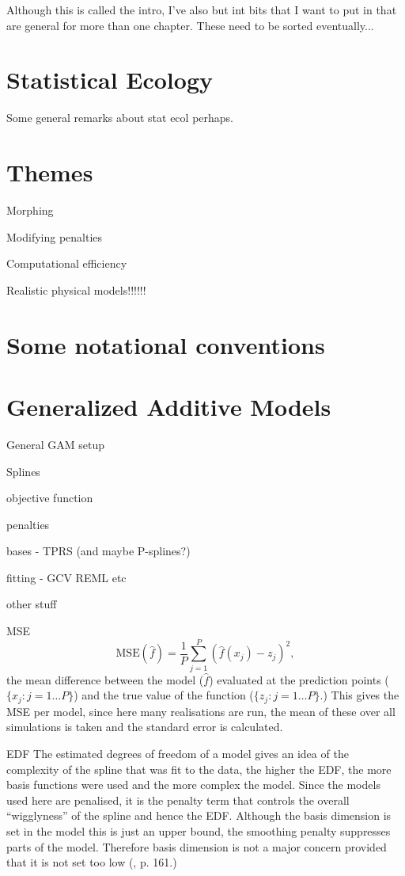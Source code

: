 Although this is called the intro, I've also but int bits that I want to put in that are general for more than one chapter. These need to be sorted eventually...

\section{Statistical Ecology}

Some general remarks about stat ecol perhaps.

\section{Themes}

\bi
	\item Morphing
	\item Modifying penalties
	\item Computational efficiency
	\item Realistic physical models!!!!!!
\ei


\section{Some notational conventions}



\section{Generalized Additive Models}

General GAM setup

\bi
\item Splines
\item objective function
\label{GAMobjfcn}
\item penalties
\label{GAMpenalties}
\item bases - TPRS (and maybe P-splines?)
\item fitting - GCV REML etc
\item other stuff
	\bi
	\item MSE
	\begin{equation}
\text{MSE}(\hat{f}) = \frac{1}{P} \sum_{j=1}^P (\hat{f}(x_j) - z_j)^2,
\end{equation}
the mean difference between the model ($\hat{f}$) evaluated at the prediction points ($\{x_j : j=1 \dots P\}$) and the true value of the function ($\{z_j : j=1 \dots P\}$.) This gives the MSE per model, since here many realisations are run, the mean of these over all simulations is taken and the standard error is calculated.
	\item EDF
	The estimated degrees of freedom of a model gives an idea of the complexity of the spline that was fit to the data, the higher the EDF, the more basis functions were used and  the more complex the model.  Since the models used here are penalised, it is the penalty term that controls the overall ``wigglyness'' of the spline and hence the EDF. Although the basis dimension is set in the model this is just an upper bound, the smoothing penalty suppresses parts of the model. Therefore basis dimension is not a major concern provided that it is not set too low (\cite{simonbook}, p. 161.) 

